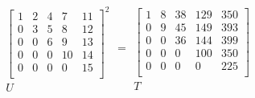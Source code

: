 \documentclass[../thesis]{subfiles}
\begin{document}
		\begin{equation}
			\begin{array}{c}
				\begin{bmatrix}
					 1 &  2 &  4 &  7 & 11  \\
					 0 &  3 &  5 &  8 & 12  \\
					 0 &  0 &  6 &  9 & 13  \\
					 0 &  0 &  0 & 10 & 14  \\
					 0 &  0 &  0 &  0 & 15  \\
				\end{bmatrix}^2  \\
				U
			\end{array}
			=
			\begin{array}{c}
				\begin{bmatrix}
					  1 &   8 &  38 & 129 & 350  \\
					  0 &   9 &  45 & 149 & 393  \\
					  0 &   0 &  36 & 144 & 399  \\
					  0 &   0 &   0 & 100 & 350  \\
					  0 &   0 &   0 &   0 & 225  \\
				\end{bmatrix}  \\
				T
			\end{array}
			\label{eq:example:5x5}
		\end{equation}
\end{document}
